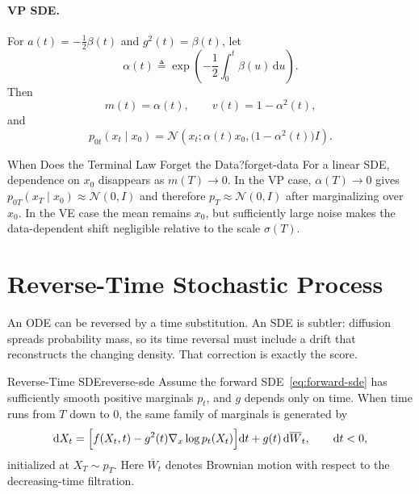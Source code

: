 \documentclass[11pt,a4paper]{article}
\renewcommand{\d}{\mathrm{d}}
\newcommand{\cN}{\mathcal{N}}
\newcommand{\bW}{\overline{W}}
\begin{document}
\paragraph{VP SDE.}
For $a(t)=-\frac12\beta(t)$ and $g^2(t)=\beta(t)$, let
\[
  \alpha(t)\triangleq
  \exp\!\left(-\frac12\int_0^t\beta(u)\,\d u\right).
\]
Then
\[
  m(t)=\alpha(t),
  \qquad
  v(t)=1-\alpha^2(t),
\]
and
\begin{equation}\label{eq:vp-kernel}
  p_{0t}(x_t\mid x_0)
  =\cN\!\left(x_t;\alpha(t)x_0,
                     \bigl(1-\alpha^2(t)\bigr)I\right).
\end{equation}

\begin{remark}{When Does the Terminal Law Forget the Data?}{forget-data}
For a linear SDE, dependence on $x_0$ disappears as $m(T)\to0$.  In the VP
case, $\alpha(T)\to0$ gives $p_{0T}(x_T\mid x_0)\approx\cN(0,I)$ and therefore
$p_T\approx\cN(0,I)$ after marginalizing over $x_0$.  In the VE case the mean
remains $x_0$, but sufficiently large noise makes the data-dependent shift
negligible relative to the scale $\sigma(T)$.
\end{remark}

\section{Reverse-Time Stochastic Process}\label{sec:reverse}

An ODE can be reversed by a time substitution.  An SDE is subtler: diffusion
spreads probability mass, so its time reversal must include a drift that
reconstructs the changing density.  That correction is exactly the score.

\begin{theorem}{Reverse-Time SDE}{reverse-sde}
Assume the forward SDE~\eqref{eq:forward-sde} has sufficiently smooth positive
marginals $p_t$, and $g$ depends only on time.  When time runs from $T$ down to
$0$, the same family of marginals is generated by
\begin{equation}\label{eq:reverse-backward-clock}
  \d X_t
  =\Bigl[f(X_t,t)-g^2(t)\nabla_x\log p_t(X_t)\Bigr]\d t
   +g(t)\,\d\bW_t,
  \qquad \d t<0,
\end{equation}
initialized at $X_T\sim p_T$.  Here $\bW_t$ denotes Brownian motion with
respect to the decreasing-time filtration.
\end{theorem}
\end{document}
